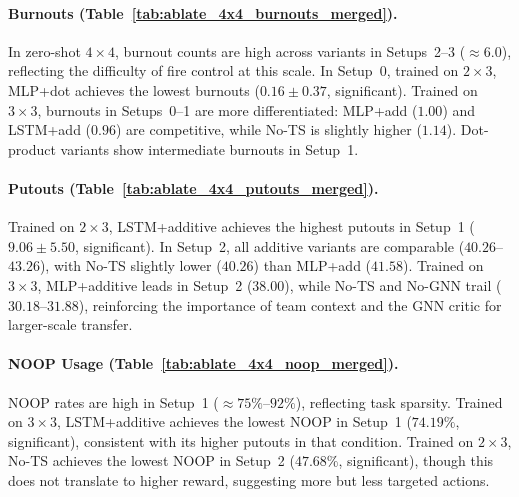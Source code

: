 \paragraph{Burnouts (Table~\ref{tab:ablate_4x4_burnouts_merged}).}
In zero-shot $4\times 4$, burnout counts are high across variants in Setups~2--3 ($\approx 6.0$), reflecting the difficulty of fire control at this scale. In Setup~0, trained on $2\times 3$, MLP+dot achieves the lowest burnouts ($0.16\pm0.37$, significant). Trained on $3\times 3$, burnouts in Setups~0--1 are more differentiated: MLP+add ($1.00$) and LSTM+add ($0.96$) are competitive, while No-TS is slightly higher ($1.14$). Dot-product variants show intermediate burnouts in Setup~1.

\paragraph{Putouts (Table~\ref{tab:ablate_4x4_putouts_merged}).}
Trained on $2\times 3$, LSTM+additive achieves the highest putouts in Setup~1 ($9.06\pm5.50$, significant). In Setup~2, all additive variants are comparable ($40.26$--$43.26$), with No-TS slightly lower ($40.26$) than MLP+add ($41.58$). Trained on $3\times 3$, MLP+additive leads in Setup~2 ($38.00$), while No-TS and No-GNN trail ($30.18$--$31.88$), reinforcing the importance of team context and the GNN critic for larger-scale transfer.

\paragraph{NOOP Usage (Table~\ref{tab:ablate_4x4_noop_merged}).}
NOOP rates are high in Setup~1 ($\approx 75\%$--$92\%$), reflecting task sparsity. Trained on $3\times 3$, LSTM+additive achieves the lowest NOOP in Setup~1 ($74.19\%$, significant), consistent with its higher putouts in that condition. Trained on $2\times 3$, No-TS achieves the lowest NOOP in Setup~2 ($47.68\%$, significant), though this does not translate to higher reward, suggesting more but less targeted actions.
